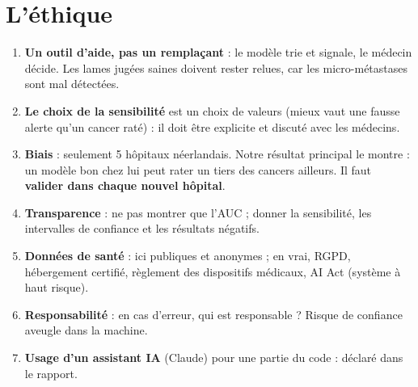 \documentclass[11pt,a4paper]{article}
\begin{document}
\section{L'éthique}\label{sec:ethique}
\begin{enumerate}
  \item \textbf{Un outil d'aide, pas un remplaçant} : le modèle trie et signale, le médecin décide. Les lames jugées saines doivent
        rester relues, car les micro-métastases sont mal détectées.
  \item \textbf{Le choix de la sensibilité} est un choix de valeurs (mieux vaut une fausse alerte qu'un cancer raté) : il doit être
        explicite et discuté avec les médecins.
  \item \textbf{Biais} : seulement 5 hôpitaux néerlandais. Notre résultat principal le montre : un modèle bon chez lui peut rater un
        tiers des cancers ailleurs. Il faut \textbf{valider dans chaque nouvel hôpital}.
  \item \textbf{Transparence} : ne pas montrer que l'AUC ; donner la sensibilité, les intervalles de confiance et les résultats négatifs.
  \item \textbf{Données de santé} : ici publiques et anonymes ; en vrai, RGPD, hébergement certifié, règlement des dispositifs médicaux,
        AI Act (système à haut risque).
  \item \textbf{Responsabilité} : en cas d'erreur, qui est responsable ? Risque de confiance aveugle dans la machine.
  \item \textbf{Usage d'un assistant IA} (Claude) pour une partie du code : déclaré dans le rapport.
\end{enumerate}

\end{document}
